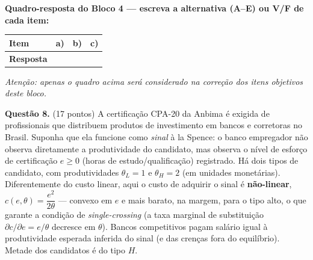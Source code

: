 \ifsolucao\else
\par\vspace{0.5em}
\begin{center}
\textbf{Quadro-resposta do Bloco 4 --- escreva a alternativa (A--E) ou V/F de cada item:}\\[0.6em]
\renewcommand{\arraystretch}{1.45}
\begin{tabular}{|>{\centering\arraybackslash}p{2.6cm}|>{\centering\arraybackslash}p{1.4cm}|>{\centering\arraybackslash}p{1.4cm}|>{\centering\arraybackslash}p{1.4cm}|}
  \hline
  \textbf{Item} & a) & b) & c) \\ \hline
  \textbf{Resposta} &  &  &  \\ \hline
\end{tabular}
\end{center}
{\small\itshape Atenção: apenas o quadro acima será considerado na correção dos itens objetivos deste bloco.}\par\vspace{0.6em}
\fi

\textbf{Questão 8.} (17 pontos) A certifica\c{c}\~ao CPA-20 da Anbima \'e exigida de profissionais que distribuem produtos de investimento em bancos e corretoras no Brasil. Suponha que ela funcione como \emph{sinal} \`a la Spence: o banco empregador n\~ao observa diretamente a produtividade do candidato, mas observa o n\'ivel de esfor\c{c}o de certifica\c{c}\~ao $e\ge 0$ (horas de estudo/qualifica\c{c}\~ao) registrado. H\'a dois tipos de candidato, com produtividades $\theta_L=1$ e $\theta_H=2$ (em unidades monet\'arias). Diferentemente do custo linear, aqui o custo de adquirir o sinal \'e \textbf{n\~ao-linear}, $c(e,\theta)=\dfrac{e^{2}}{2\theta}$ --- convexo em $e$ e mais barato, na margem, para o tipo alto, o que garante a condi\c{c}\~ao de \emph{single-crossing} (a taxa marginal de subs\-tit\-ui\c{c}\~ao $\partial c/\partial e=e/\theta$ decresce em $\theta$). Bancos competitivos pagam sal\'ario igual \`a produtividade esperada inferida do sinal (e das cren\c{c}as fora do equil\'ibrio). Metade dos candidatos \'e do tipo $H$.

